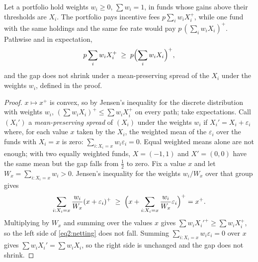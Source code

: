\begin{chapterrefs}
\begin{proposition}\label{prop2:netting}
Let a portfolio hold weights $w_i\ge 0$, $\sum w_i = 1$, in funds whose gains above their thresholds are
$X_i$. The portfolio pays incentive fees $p\sum_i w_i X_i^{+}$, while one fund with the same holdings and
the same fee rate would pay $p\,(\sum_i w_i X_i)^{+}$. Pathwise and in expectation,
\begin{equation}\label{eq2:netting}
  p\sum_i w_i X_i^{+} \;\ge\; p\Bigl(\sum_i w_i X_i\Bigr)^{+},
\end{equation}
and the gap does not shrink under a mean-preserving spread of the $X_i$ under the weights $w_i$,
defined in the proof.
\end{proposition}
\begin{proof}
$x\mapsto x^{+}$ is convex, so by Jensen's inequality for the discrete distribution with weights $w_i$,
$(\sum w_i X_i)^{+} \le \sum w_i X_i^{+}$ on every path; take expectations.
Call $(X_i')$ a \emph{mean-preserving spread} of $(X_i)$ under the weights $w_i$ if $X_i' = X_i + \varepsilon_i$
where, for each value $x$ taken by the $X_i$, the weighted mean of the $\varepsilon_i$ over the funds with
$X_i = x$ is zero: $\sum_{i:X_i=x} w_i\varepsilon_i = 0$. Equal weighted means alone are not enough; with
two equally weighted funds, $X=(-1,1)$ and $X'=(0,0)$ have the same mean but the gap falls from $\tfrac12$
to zero. Fix a value $x$ and let $W_x = \sum_{i:X_i=x} w_i > 0$. Jensen's inequality for the weights
$w_i/W_x$ over that group gives
\[
  \sum_{i:X_i=x} \frac{w_i}{W_x}(x+\varepsilon_i)^{+} \;\ge\; \Bigl(x + \sum_{i:X_i=x}\frac{w_i}{W_x}\varepsilon_i\Bigr)^{+} = x^{+}.
\]
Multiplying by $W_x$ and summing over the values $x$ gives $\sum w_i X_i'^{+} \ge \sum w_i X_i^{+}$, so
the left side of \cref{eq2:netting} does not fall. Summing $\sum_{i:X_i=x} w_i\varepsilon_i = 0$ over $x$
gives $\sum w_i X_i' = \sum w_i X_i$, so the right side is unchanged and the gap does not shrink.
\end{proof}


\end{chapterrefs}
